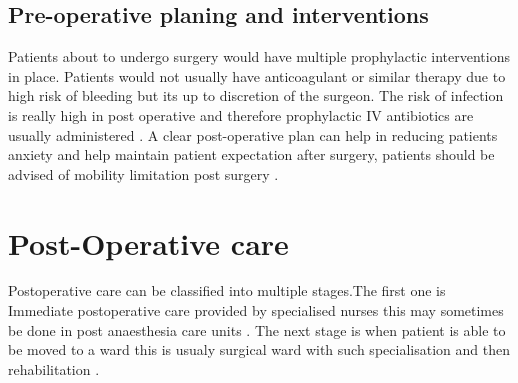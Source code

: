 \documentclass[a4paper,man,british]{apa6}
\begin{document}
\subsection{Pre-operative planing and interventions}

Patients about to undergo surgery would have multiple prophylactic interventions in place. Patients would not usually have anticoagulant  or similar therapy due to high risk of bleeding but its up to discretion of the surgeon. The risk of infection is really high in post operative and therefore prophylactic IV antibiotics are usually administered \parencite{lundine_adherence_2010}.
A clear post-operative plan can help in reducing patients anxiety and help maintain patient expectation after surgery, patients should be advised of mobility limitation post surgery \parencite{mcdonald_preoperative_2014}.




\section{Post-Operative care} %
Postoperative care can be classified into multiple stages.The first one is Immediate postoperative care provided by specialised nurses this may sometimes be done in post anaesthesia care units \parencite{liddle_principles_2013}. The next stage is when patient is able to be moved to a ward this is usualy surgical ward with such specialisation and then rehabilitation \parencite{chesser_new_2011,nanavati_fast-track_2014}.
\end{document}
